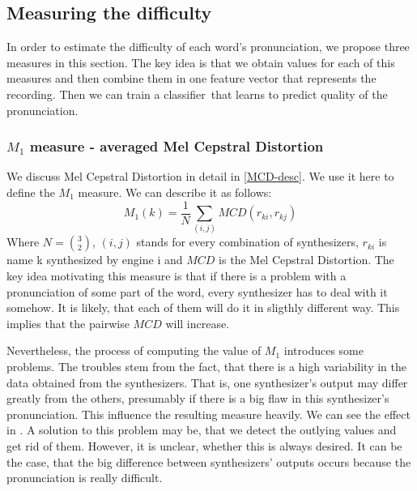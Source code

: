 \subsection{Measuring the difficulty}
In order to estimate the difficulty of each word's pronunciation, we propose three measures in this section. The key idea is that we obtain values for each of this measures and then combine them in one feature vector that represents the recording.
Then we can train a classifier\ that learns to predict quality of the pronunciation.
\subsubsection{$M_1$ measure - averaged Mel Cepstral Distortion}
We discuss Mel Cepstral Distortion in detail in \ref{MCD-desc}. We use it here to define the $M_1$ measure. We can describe it as follows:
\begin{equation}
M_1(k) = \frac{1}{N}\sum_{(i,j)}{MCD(r_{ki},r_{kj})}
\end{equation}
Where $N = {3\choose2}$, $(i,j)$ stands for every combination of synthesizers, $r_{ki}$ is name {k} synthesized by engine {i} and $MCD$ is the Mel Cepstral Distortion.
The key idea motivating this measure is that if there is a problem with a pronunciation of some part of the word, every synthesizer has to deal with it somehow. It is likely, that each of them will do it in sligthly different way. This implies that the pairwise $MCD$ will increase.
\par
Nevertheless, the process of computing the value of $M_1$ introduces some problems. The troubles stem from the fact, that there is a high variability in the data obtained from the synthesizers.
That is, one synthesizer's output may differ greatly from the others, presumably if there is a big flaw in this synthesizer's pronunciation.
This influence the resulting measure heavily.
We can see the effect in .
A solution to this problem may be, that we detect the outlying values and get rid of them.
However, it is unclear, whether this is always desired.
It can be the case, that the big difference between synthesizers' outputs occurs because the pronunciation is really difficult.
